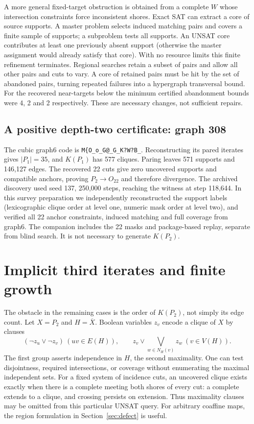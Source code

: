 \documentclass[11pt,a4paper]{article}
\theoremstyle{definition}\newtheorem{definition}[theorem]{Definition}\newtheorem{example}[theorem]{Example}
\theoremstyle{remark}\newtheorem{remark}[theorem]{Remark}
\begin{document}
A more general fixed-target obstruction is obtained from a complete \(W\) whose intersection constraints force inconsistent shores. Exact SAT can extract a core of source supports. A master problem selects induced matching pairs and covers a finite sample of supports; a subproblem tests all supports. An UNSAT core contributes at least one previously absent support (otherwise the master assignment would already satisfy that core). With no resource limits this finite refinement terminates. Regional searches retain a subset of pairs and allow all other pairs and cuts to vary. A core of retained pairs must be hit by the set of abandoned pairs, turning repeated failures into a hypergraph transversal bound. For the recovered near-targets below the minimum certified abandonment bounds were 4, 2 and 2 respectively. These are necessary changes, not sufficient repairs.

\subsection{A positive depth-two certificate: graph 308}
The cubic graph6 code is \verb|M{O_o_G@_G_K?W?B_|. Reconstructing its pared iterates gives \(|P_1|=35\), and \(K(P_1)\) has 577 cliques. Paring leaves 571 supports and 146,127 edges. The recovered 22 cuts give zero uncovered supports and compatible anchors, proving \(P_2\to O_{22}\) and therefore divergence. The archived discovery used seed 137, 250,000 steps, reaching the witness at step 118,644. In this survey preparation we independently reconstructed the support labels (lexicographic clique order at level one, numeric mask order at level two), and verified all 22 anchor constraints, induced matching and full coverage from graph6. The companion includes the 22 masks and package-based replay, separate from blind search. It is not necessary to generate \(K(P_2)\).

\section{Implicit third iterates and finite growth}\label{sec:implicit}
The obstacle in the remaining cases is the order of \(K(P_2)\), not simply its edge count. Let \(X=P_2\) and \(H=\overline X\). Boolean variables \(z_v\) encode a clique of \(X\) by clauses
\[
 (\neg z_u\lor\neg z_v)\ (uv\in E(H)),\qquad
 z_v\lor\bigvee_{w\in N_H(v)}z_w\ (v\in V(H)).
\]
The first group asserts independence in \(H\), the second maximality. One can test disjointness, required intersections, or coverage without enumerating the maximal independent sets. For a fixed system of incidence cuts, an uncovered clique exists exactly when there is a complete meeting both shores of every cut: a complete extends to a clique, and crossing persists on extension. Thus maximality clauses may be omitted from this particular UNSAT query. For arbitrary coaffine maps, the region formulation in Section~\ref{sec:defect} is useful.
\end{document}
